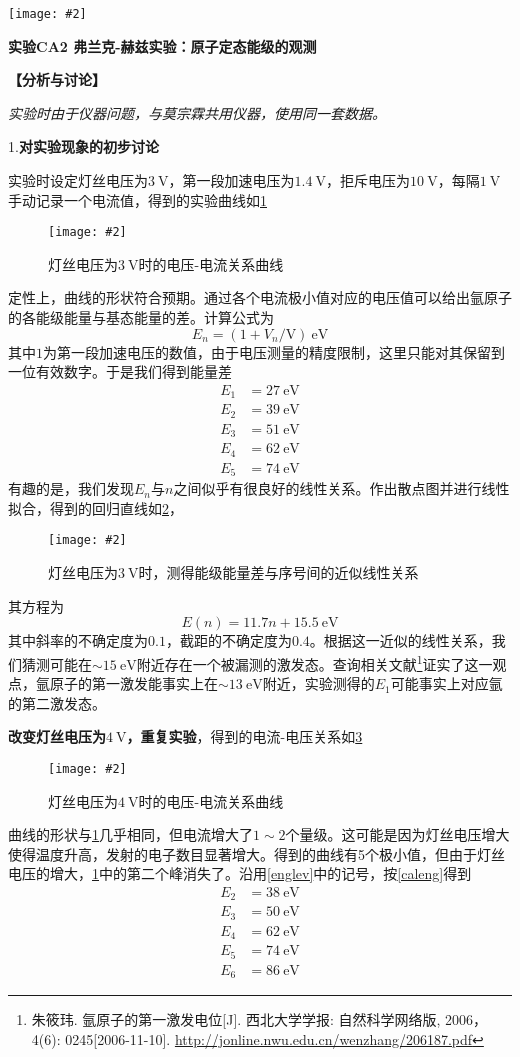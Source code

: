 \documentclass[11pt,a4paper]{ctexart}
\newcommand{\ExpeName}{实验CA2 弗兰克-赫兹实验：原子定态能级的观测}
\newcommand{\cpic}[2]{
\begin{center}
\texttt{[image: \#2]}
\end{center}
}
\newcommand{\cpicn}[3]
{
\begin{figure}[h!]
\cpic{#1}{#2}
\caption{#3\label{#2}}
\end{figure}
}
\newcommand{\beq}{\begin{equation}}
\newcommand{\eeq}{\end{equation}}
\newcommand{\volt}{\mathrm{V}}
\begin{document}
\newpage%
\cpic{0.255}{e3}%
\begin{center}
\LARGE\textbf{{\ExpeName}}
\end{center}
\textbf{【分析与讨论】}\par
{\em 实验时由于仪器问题，与莫宗霖共用仪器，使用同一套数据。}\par
1.\textbf{对实验现象的初步讨论}
\par
实验时设定灯丝电压为$3\ \volt$，第一段加速电压为$1.4\ \volt$，拒斥电压为$10\ \volt$，每隔$1\ \volt$手动记录一个电流值，得到的实验曲线如\cref{curve3v}
\cpicn{0.5}{curve3v}{灯丝电压为$3\ \volt$时的电压-电流关系曲线}
定性上，曲线的形状符合预期。通过各个电流极小值对应的电压值可以给出氩原子的各能级能量与基态能量的差。计算公式为
\beq \label{caleng}
 E_n = (1 + V_n/\volt)\ \mathrm{eV}
\eeq
其中$1$为第一段加速电压的数值，由于电压测量的精度限制，这里只能对其保留到一位有效数字。于是我们得到能量差
\begin{align}\label{englev} E_1 &= 27\ \mathrm{eV} \\
 E_2 &= 39\ \mathrm{eV} \\
 E_3 &= 51\ \mathrm{eV} \\
 E_4 &= 62\ \mathrm{eV} \\
 E_5 &= 74\ \mathrm{eV} 
\end{align}
有趣的是，我们发现$E_n$与$n$之间似乎有很良好的线性关系。作出散点图并进行线性拟合，得到的回归直线如\cref{fit3v}，
\cpicn{0.6}{fit3v}{灯丝电压为$3\ \volt$时，测得能级能量差与序号间的近似线性关系}
其方程为
\beq
E(n) = 11.7n + 15.5 \ \mathrm{eV}
\eeq
其中斜率的不确定度为$0.1$，截距的不确定度为$0.4$。根据这一近似的线性关系，我们猜测可能在$\sim 15 \mathrm{\ eV}$附近存在一个被漏测的激发态。查询相关文献\footnote{朱筱玮. 氩原子的第一激发电位[J]. 西北大学学报: 自然科学网络版, 2006，4(6): 0245[2006-11-10].
\url{http://jonline.nwu.edu.cn/wenzhang/206187.pdf}}证实了这一观点，氩原子的第一激发能事实上在$\sim 13 \mathrm{\ eV}$附近，实验测得的$E_1$可能事实上对应氩的第二激发态。
\par
\textbf{改变灯丝电压为$4 \ \volt$，重复实验}，得到的电流-电压关系如\cref{curve4v}
\cpicn{0.5}{curve4v}{灯丝电压为$4\ \volt$时的电压-电流关系曲线}
曲线的形状与\cref{curve3v}几乎相同，但电流增大了$1\sim 2$个量级。这可能是因为灯丝电压增大使得温度升高，发射的电子数目显著增大。得到的曲线有5个极小值，但由于灯丝电压的增大，\cref{curve3v}中的第二个峰消失了。沿用\cref{englev}中的记号，按\cref{caleng}得到
\begin{align}
 E_2 &= 38\ \mathrm{eV} \\
 E_3 &= 50\ \mathrm{eV} \\
 E_4 &= 62\ \mathrm{eV} \\
 E_5 &= 74\ \mathrm{eV} \\
 E_6 &= 86\ \mathrm{eV}
\end{align}
\end{document}
